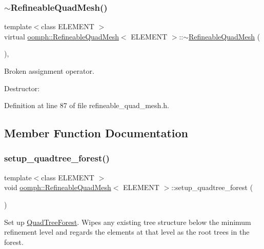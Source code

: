 \subsubsection{\texorpdfstring{$\sim$\+Refineable\+Quad\+Mesh()}{~RefineableQuadMesh()}}
{\footnotesize\ttfamily template$<$class E\+L\+E\+M\+E\+NT $>$ \\
virtual \hyperlink{classoomph_1_1RefineableQuadMesh}{oomph\+::\+Refineable\+Quad\+Mesh}$<$ E\+L\+E\+M\+E\+NT $>$\+::$\sim$\hyperlink{classoomph_1_1RefineableQuadMesh}{Refineable\+Quad\+Mesh} (\begin{DoxyParamCaption}{ }\end{DoxyParamCaption})\hspace{0.3cm}{\ttfamily [inline]}, {\ttfamily [virtual]}}



Broken assignment operator. 

Destructor\+: 

Definition at line 87 of file refineable\+\_\+quad\+\_\+mesh.\+h.



\subsection{Member Function Documentation}
\mbox{\label{classoomph_1_1RefineableQuadMesh_ab27780da6f9be1b625d75fc4973ce8f1}} 
\subsubsection{\texorpdfstring{setup\+\_\+quadtree\+\_\+forest()}{setup\_quadtree\_forest()}}
{\footnotesize\ttfamily template$<$class E\+L\+E\+M\+E\+NT $>$ \\
void \hyperlink{classoomph_1_1RefineableQuadMesh}{oomph\+::\+Refineable\+Quad\+Mesh}$<$ E\+L\+E\+M\+E\+NT $>$\+::setup\+\_\+quadtree\+\_\+forest (\begin{DoxyParamCaption}{ }\end{DoxyParamCaption})\hspace{0.3cm}{\ttfamily [inline]}}



Set up \hyperlink{classoomph_1_1QuadTreeForest}{Quad\+Tree\+Forest}. Wipes any existing tree structure below the minimum refinement level and regards the elements at that level as the root trees in the forest. 



